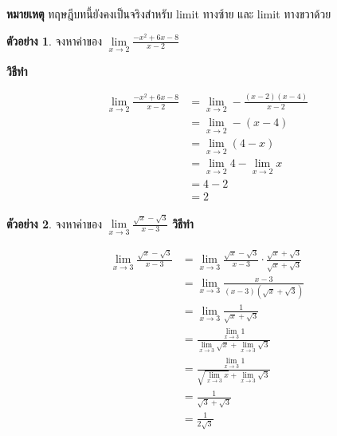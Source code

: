 \documentclass[
]{book}
\theoremstyle{definition}
\theoremstyle{definition}
\newtheorem{example}{ตัวอย่าง}[chapter]
\theoremstyle{definition}
\theoremstyle{definition}
\theoremstyle{remark}
\begin{document}
\textbf{หมายเหตุ} ทฤษฎีบทนี้ยังคงเป็นจริงสำหรับ limit ทางซ้าย และ limit ทางขวาด้วย

\begin{example}
\protect\hypertarget{exm:ex-limit-3}{}\label{exm:ex-limit-3}จงหาค่าของ \(\underset{x\rightarrow 2}{\lim}\frac{-x^{2}+6x-8}{x-2}\)
\end{example}

\textbf{วิธีทำ}

\begin{equation}
  \begin{aligned}
    \lim_{x\rightarrow 2}\frac{-x^{2}+6x-8}{x-2}
    &= \lim_{x\rightarrow 2} -\frac{\left( x-2\right) \left( x-4\right) }{x-2}\\
    &= \lim_{x\rightarrow 2} -\left( x-4\right) \\ %
    &= \lim_{x\rightarrow 2}\left( 4-x\right) \\
    &= \lim_{x\rightarrow 2}4-\lim_{x\rightarrow 2}x\\
    &= 4-2 \\
    &= 2
  \end{aligned}
\end{equation}

\begin{example}
\protect\hypertarget{exm:ex-limit-4}{}\label{exm:ex-limit-4}จงหาค่าของ \(\underset{x\rightarrow 3}{\lim}\frac{\sqrt{x}-\sqrt{3}}{x-3}\)
\textbf{วิธีทำ}

\begin{equation}
  \begin{aligned}
    \lim_{x\rightarrow 3}\frac{\sqrt{x}-\sqrt{3}}{x-3}
    &= \lim_{x\rightarrow 3}\frac{\sqrt{x}-\sqrt{3}}{x-3}\cdot \frac{\sqrt{x}+\sqrt{3}}{\sqrt{x}+\sqrt{3}} \\
    &= \lim_{x\rightarrow 3}\frac{x-3}{\left( x-3\right) \left( \sqrt{x}+\sqrt{3}\right) } \\
    &= \lim_{x\rightarrow 3}\frac{1}{\sqrt{x}+\sqrt{3}}\\
    &= \frac{\lim_{x\rightarrow 3}1}{\lim_{x\rightarrow 3} \sqrt{x} + \lim_{x\rightarrow 3} \sqrt{3}} \\
    &= \frac{\lim_{x\rightarrow 3}1}{\sqrt{\lim_{x\rightarrow 3}x}+\lim_{x\rightarrow 3}\sqrt{3}} \\
    &= \frac{1}{\sqrt{3}+\sqrt{3}} \\
    &= \frac{1}{2\sqrt{3}} \\
  \end{aligned}
\end{equation}
\end{example}
\end{document}
